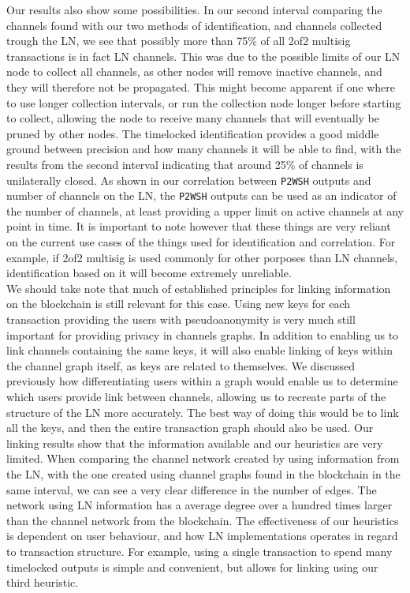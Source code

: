 Our results also show some possibilities. In our second interval comparing the channels found with our two methods of identification, and channels collected trough the LN, we see that possibly more than 75\% of all 2of2 multisig transactions is in fact LN channels. This was due to the possible limits of our LN node to collect all channels, as other nodes will remove inactive channels, and they will therefore not be propagated. This might become apparent if one where to use longer collection intervals, or run the collection node longer before starting to collect, allowing the node to receive many channels that will eventually be pruned by other nodes.
The timelocked identification provides a good middle ground between precision and how many channels it will be able to find, with the results from the second interval indicating that around 25\% of channels is unilaterally closed. As shown in our correlation between {\tt P2WSH} outputs and number of channels on the LN, the {\tt P2WSH} outputs can be used as an indicator of the number of channels, at least providing a upper limit on active channels at any point in time. It is important to note however that these things are very reliant on the current use cases of the things used for identification and correlation. For example, if 2of2 multisig is used commonly for other porposes than LN channels, identification based on it will become extremely unreliable. 
\\


We should take note that much of established principles for linking information on the blockchain is still relevant for this case. Using new keys for each transaction providing the users with pseudoanonymity is very much still important for providing privacy in channels graphs. In addition to enabling us to link channels containing the same keys, it will also enable linking of keys within the channel graph itself, as keys are related to themselves. We discussed previously how differentiating users within a graph would enable us to determine which users provide link between channels, allowing us to recreate parts of the structure of the LN more accurately. The best way of doing this would be to link all the keys, and then the entire transaction graph should also be used.
Our linking results show that the information available and our heuristics are very limited. When comparing the channel network created by using information from the LN, with the one created using channel graphs found in the blockchain in the same interval, we can see a very clear difference in the number of edges. The network using LN information has a average degree over a hundred times larger than the channel network from the blockchain. The effectiveness of our heuristics is dependent on user behaviour, and how LN implementations operates in regard to transaction structure. For example, using a single transaction to spend many timelocked outputs is simple and convenient, but allows for linking using our third heuristic.
\\


